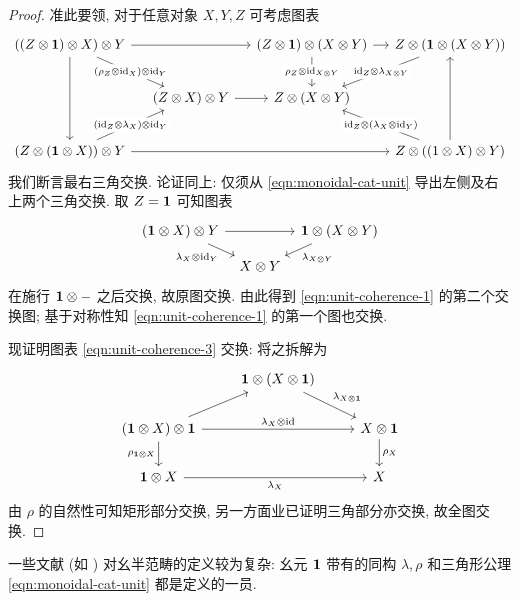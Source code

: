 \begin{proof}
	准此要领, 对于任意对象 $X, Y, Z$ 可考虑图表
	\begin{equation*}\begin{tikzcd}[column sep=small, row sep=2.25em]
		((Z \otimes \munit) \otimes X) \otimes Y \arrow[dd] \arrow[rr] \arrow[rd, "{(\rho_Z \otimes \identity_X) \otimes \identity_Y}" description] & & (Z \otimes \munit) \otimes (X \otimes Y) \arrow[r] \arrow[d, "{\rho_Z \otimes \identity_{X \otimes Y}}" description] & Z \otimes (\munit \otimes (X \otimes Y)) \arrow[ld, "{\identity_Z \otimes \lambda_{X \otimes Y}}" description] \\
		& (Z \otimes X) \otimes Y \arrow[r] & Z \otimes (X \otimes Y) & \\
		(Z \otimes (\munit \otimes X)) \otimes Y \arrow[rrr] \arrow[ru, "{(\identity_Z \otimes \lambda_X) \otimes \identity_Y}" description] & & & Z \otimes ((1 \otimes X) \otimes Y) \arrow[uu] \arrow[lu, "{\identity_Z \otimes (\lambda_X \otimes \identity_Y)}" description]
	\end{tikzcd}\end{equation*}
	我们断言最右三角交换. 论证同上: 仅须从 \eqref{eqn:monoidal-cat-unit} 导出左侧及右上两个三角交换. 取 $Z = \mathbf{1}$ 可知图表
	\[ \begin{tikzcd}[column sep=tiny, row sep=small]
		(\munit \otimes X) \otimes Y \arrow[rr] \arrow[rd, "{\lambda_X \otimes \identity_Y}"'] & & \munit \otimes (X \otimes Y) \arrow[ld, "{\lambda_{X \otimes Y}}"] \\
		& X \otimes Y &
	\end{tikzcd} \]
	在施行 $\mathbf{1} \otimes -$ 之后交换, 故原图交换. 由此得到 \eqref{eqn:unit-coherence-1} 的第二个交换图; 基于对称性知 \eqref{eqn:unit-coherence-1} 的第一个图也交换.

	现证明图表 \eqref{eqn:unit-coherence-3} 交换: 将之拆解为
	\[ \begin{tikzcd}
		{} & \munit \otimes (X \otimes \munit) \arrow[rd, "{\lambda_{X \otimes \munit}}"] & \\
		(\munit \otimes X) \otimes \munit \arrow[rr, "{\lambda_X \otimes \identity}"] \arrow[d, "{\rho_{\munit \otimes X}}"'] \arrow[ru] & & X \otimes \munit \arrow[d, "{\rho_X}"] \\
		\munit \otimes X \arrow[rr, "{\lambda_X}"'] & & X
	\end{tikzcd}\]
	由 $\rho$ 的自然性可知矩形部分交换, 另一方面业已证明三角部分亦交换, 故全图交换.
\end{proof}

\begin{remark}
	一些文献 (如 \cite{ML98}) 对幺半范畴的定义较为复杂: 幺元 $\mathbf{1}$ 带有的同构 $\lambda, \rho$ 和三角形公理 \eqref{eqn:monoidal-cat-unit} 都是定义的一员.
\end{remark}

